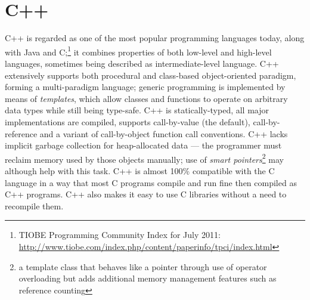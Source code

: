 \section{C++}

C++ is regarded as one of the most popular programming languages today, along with Java and
C;\footnote{TIOBE Programming Community Index for July 2011:
\url{http://www.tiobe.com/index.php/content/paperinfo/tpci/index.html}} it combines properties of
both low-level and high-level languages, sometimes being described as intermediate-level language.
C++ extensively supports both procedural and class-based object-oriented paradigm, forming a
multi-paradigm language; generic programming is implemented by means of \emph{templates}, which
allow classes and functions to operate on arbitrary data types while still being type-safe.
C++ is statically-typed, all major implementations are compiled, supports call-by-value (the
default), call-by-reference and a variant of call-by-object function call conventions. C++ lacks
implicit garbage collection for heap-allocated data --- the programmer must reclaim memory used
by those objects manually; use of \emph{smart pointers}\footnote{a template class that behaves like
a pointer through use of operator overloading but adds additional memory management features such as
reference counting} may although help with this task. C++ is almost 100\% compatible with the C
language in a way that most C programs compile and run fine then compiled as C++ programs. C++ also
makes it easy to use C libraries without a need to recompile them.~\cite{Str:00}

